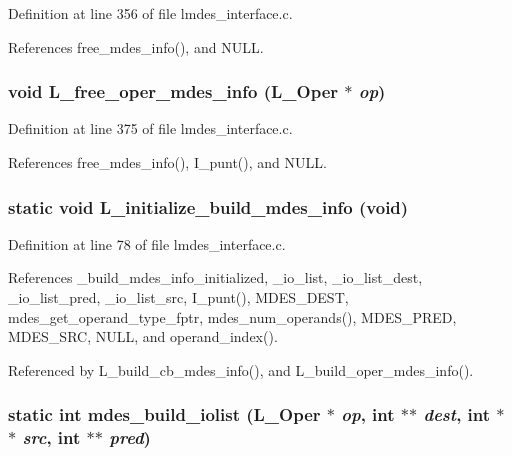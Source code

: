 Definition at line 356 of file lmdes\_\-interface.c.

References free\_\-mdes\_\-info(), and NULL.
\subsubsection{\setlength{\rightskip}{0pt plus 5cm}void L\_\-free\_\-oper\_\-mdes\_\-info (L\_\-Oper $\ast$ {\em op})}\label{lmdes__interface_8c_16b54b93a47c58b6f32309b486b937be}




Definition at line 375 of file lmdes\_\-interface.c.

References free\_\-mdes\_\-info(), I\_\-punt(), and NULL.
\subsubsection{\setlength{\rightskip}{0pt plus 5cm}static void L\_\-initialize\_\-build\_\-mdes\_\-info (void)\hspace{0.3cm}{\tt  [static]}}\label{lmdes__interface_8c_7ae4c8e51787fe1d69ea4221f223d109}




Definition at line 78 of file lmdes\_\-interface.c.

References \_\-build\_\-mdes\_\-info\_\-initialized, \_\-io\_\-list, \_\-io\_\-list\_\-dest, \_\-io\_\-list\_\-pred, \_\-io\_\-list\_\-src, I\_\-punt(), MDES\_\-DEST, mdes\_\-get\_\-operand\_\-type\_\-fptr, mdes\_\-num\_\-operands(), MDES\_\-PRED, MDES\_\-SRC, NULL, and operand\_\-index().

Referenced by L\_\-build\_\-cb\_\-mdes\_\-info(), and L\_\-build\_\-oper\_\-mdes\_\-info().
\subsubsection{\setlength{\rightskip}{0pt plus 5cm}static int mdes\_\-build\_\-iolist (L\_\-Oper $\ast$ {\em op}, int $\ast$$\ast$ {\em dest}, int $\ast$$\ast$ {\em src}, int $\ast$$\ast$ {\em pred})\hspace{0.3cm}{\tt  [static]}}\label{lmdes__interface_8c_e4b6847eed215e3055e4565f7fe0670a}




